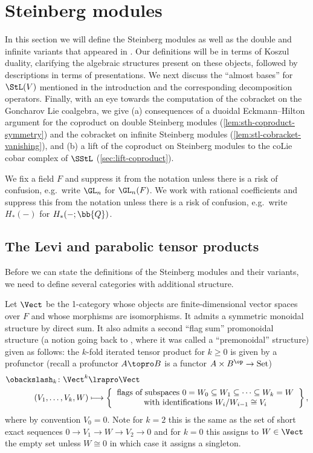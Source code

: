 \documentclass[a4paper]{amsart}
\begin{document}
\section{Steinberg modules} In this section we will define the Steinberg modules as well as the double and infinite variants that appeared in \cite{GKRW20,CharltonRadchenkoRudenko}. Our definitions will be in terms of Koszul duality, clarifying the algebraic structures present on these objects, followed by descriptions in terms of presentations. We next discuss the ``almost bases'' for $\StL(V)$ mentioned in the introduction and the corresponding decomposition operators. Finally, with an eye towards the computation of the cobracket on the Goncharov Lie coalgebra, we give (a) consequences of a duoidal Eckmann--Hilton argument for the coproduct on double Steinberg modules (\cref{lem:sth-coproduct-symmetry}) and the cobracket on infinite Steinberg modules (\cref{lem:stl-cobracket-vanishing}), and (b) a lift of the coproduct on Steinberg modules to the coLie cobar complex of $\SStL$ (\cref{sec:lift-coproduct}).

\begin{convention}\label{conv:shorter-notation} We fix a field $F$ and suppress it from the notation unless there is a risk of confusion, e.g.~write $\GL_n$ for $\GL_n(F)$. We work with rational coefficients and suppress this from the notation unless there is a risk of confusion, e.g.~write $H_*(-)$ for $H_*(-;\bb{Q})$.\end{convention}

\subsection{The Levi and parabolic tensor products} Before we can state the definitions of the Steinberg modules and their variants, we need to define several categories with additional structure.

\smallskip

Let $\Vect$ be the 1-category whose objects are finite-dimensional vector spaces over $F$ and whose morphisms are isomorphisms. It admits a symmetric monoidal structure by direct sum. It also admits a second ``flag sum'' promonoidal structure (a notion going back to \cite[Section 3]{Day}, where it was called a ``premonoidal'' structure) given as follows: the $k$-fold iterated tensor product for $k \geq 0$ is given by a profunctor (recall a profunctor $A \topro B$ is a functor $A \times B^\op \to \rm{Set}$)
\begin{align*} \obackslash_k \colon \Vect^k  &\lrapro \Vect \\
(V_1,\ldots,V_k,W) &\longmapsto \left\{\text{\parbox[c]{8cm}{\centering flags of subspaces $0 = W_0 \subseteq W_1 \subseteq \cdots \subseteq W_k = W$ with identifications $W_i/W_{i-1} \cong V_i$}}\right\},\end{align*}
where by convention $V_0 = 0$. Note for $k=2$ this is the same as the set of short exact sequences $0 \to V_1 \to W \to V_2 \to 0$ and for $k=0$ this assigns to $W \in \Vect$ the empty set unless $W \cong 0$ in which case it assigns a singleton.
\end{document}
